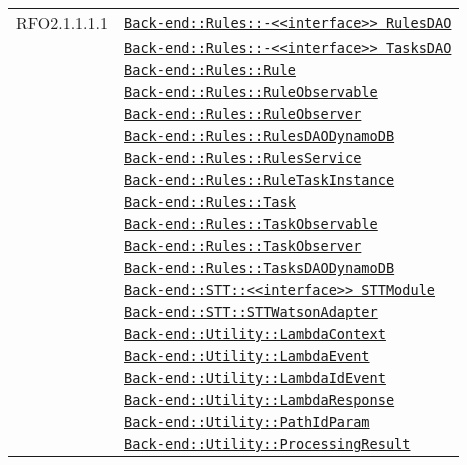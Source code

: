 \begin{longtable}{|>{\centering}m{3cm}|m{10cm}<{\centering}|}
RFO2.1.1.1.1 & \hyperref[Back-end::Rules::<<interface>> RulesDAO]{\texttt{Back-end::Rules::-\linebreak <<interface>> RulesDAO}}\\
& \hyperref[Back-end::Rules::<<interface>> TasksDAO]{\texttt{Back-end::Rules::-\linebreak <<interface>> TasksDAO}}\\
& \hyperref[Back-end::Rules::Rule]{\texttt{Back-end::Rules::Rule}}\\
& \hyperref[Back-end::Rules::RuleObservable]{\texttt{Back-end::Rules::RuleObservable}}\\
& \hyperref[Back-end::Rules::RuleObserver]{\texttt{Back-end::Rules::RuleObserver}}\\
& \hyperref[Back-end::Rules::RulesDAODynamoDB]{\texttt{Back-end::Rules::RulesDAODynamoDB}}\\
& \hyperref[Back-end::Rules::RulesService]{\texttt{Back-end::Rules::RulesService}}\\
& \hyperref[Back-end::Rules::RuleTaskInstance]{\texttt{Back-end::Rules::RuleTaskInstance}}\\
& \hyperref[Back-end::Rules::Task]{\texttt{Back-end::Rules::Task}}\\
& \hyperref[Back-end::Rules::TaskObservable]{\texttt{Back-end::Rules::TaskObservable}}\\
& \hyperref[Back-end::Rules::TaskObserver]{\texttt{Back-end::Rules::TaskObserver}}\\
& \hyperref[Back-end::Rules::TasksDAODynamoDB]{\texttt{Back-end::Rules::TasksDAODynamoDB}}\\
& \hyperref[Back-end::STT::<<interface>> STTModule]{\texttt{Back-end::STT::<<interface>> STTModule}}\\
& \hyperref[Back-end::STT::STTWatsonAdapter]{\texttt{Back-end::STT::STTWatsonAdapter}}\\
& \hyperref[Back-end::Utility::LambdaContext]{\texttt{Back-end::Utility::LambdaContext}}\\
& \hyperref[Back-end::Utility::LambdaEvent]{\texttt{Back-end::Utility::LambdaEvent}}\\
& \hyperref[Back-end::Utility::LambdaIdEvent]{\texttt{Back-end::Utility::LambdaIdEvent}}\\
& \hyperref[Back-end::Utility::LambdaResponse]{\texttt{Back-end::Utility::LambdaResponse}}\\
& \hyperref[Back-end::Utility::PathIdParam]{\texttt{Back-end::Utility::PathIdParam}}\\
& \hyperref[Back-end::Utility::ProcessingResult]{\texttt{Back-end::Utility::ProcessingResult}}\\

\end{longtable}
